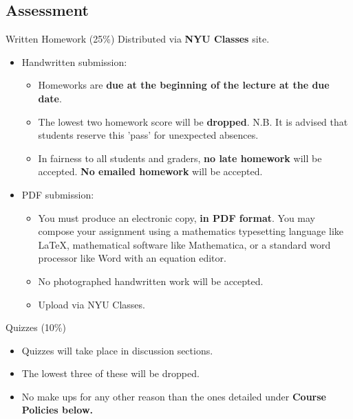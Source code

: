 \documentclass{beamer}
\begin{document}
\subsection{Assessment}

\begin{frame}{Written Homework (25\%)}
Distributed via \textbf{NYU Classes} site.

\begin{itemize}
\item<2-> Handwritten submission:
\begin{itemize}
\item<3-> Homeworks are \textbf{due at the beginning of the lecture at the due date}.
\item<4-> The lowest two homework score will be \textbf{dropped}. N.B. It is advised that students reserve this 'pass' for unexpected
absences.
\item<5-> In fairness to all students and graders, \textbf{no late homework} will be accepted. \textbf{No emailed homework} will be accepted.
\end{itemize}

\item<2-> PDF submission:

\begin{itemize}
\item<6->You must produce an electronic copy, \textbf{in PDF
format}. You may compose your assignment using a mathematics typesetting language like LaTeX, mathematical
software like Mathematica, or a standard word processor like Word with an equation editor.
\item<7-> No photographed handwritten work will be accepted.
\item<8-> Upload via NYU Classes.
\end{itemize}
\end{itemize}

\end{frame}

\begin{frame}{Quizzes (10\%)}
\begin{itemize}
\item Quizzes will take place in discussion sections.  \pause
\item The lowest three of these will be dropped. \pause
\item No make ups for any other reason than the ones detailed under \bf{Course Policies} below.
\end{itemize}
\end{frame}
\end{document}
